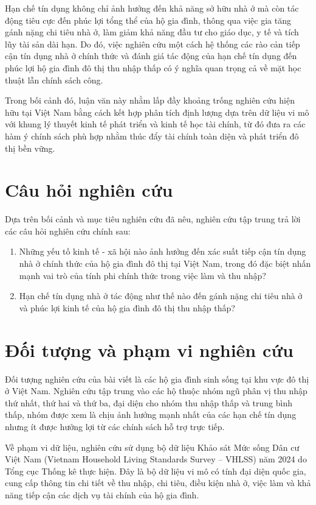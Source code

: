 \documentclass[12pt,a4paper]{report}
\begin{document}
	Hạn chế tín dụng không chỉ ảnh hưởng đến khả năng sở hữu nhà ở mà còn tác động tiêu cực đến phúc lợi tổng thể của hộ gia đình, thông qua việc gia tăng gánh nặng chi tiêu nhà ở, làm giảm khả năng đầu tư cho giáo dục, y tế và tích lũy tài sản dài hạn. Do đó, việc nghiên cứu một cách hệ thống các rào cản tiếp cận tín dụng nhà ở chính thức và đánh giá tác động của hạn chế tín dụng đến phúc lợi hộ gia đình đô thị thu nhập thấp có ý nghĩa quan trọng cả về mặt học thuật lẫn chính sách công.
	
	Trong bối cảnh đó, luận văn này nhằm lấp đầy khoảng trống nghiên cứu hiện hữu tại Việt Nam bằng cách kết hợp phân tích định lượng dựa trên dữ liệu vi mô với khung lý thuyết kinh tế phát triển và kinh tế học tài chính, từ đó đưa ra các hàm ý chính sách phù hợp nhằm thúc đẩy tài chính toàn diện và phát triển đô thị bền vững.
	
	\section{Câu hỏi nghiên cứu}
	
	Dựa trên bối cảnh và mục tiêu nghiên cứu đã nêu, nghiên cứu tập trung trả lời các câu hỏi nghiên cứu chính sau:
	
	\begin{enumerate}
		\item Những yếu tố kinh tế - xã hội nào ảnh hưởng đến xác suất tiếp cận tín dụng nhà ở chính thức của hộ gia đình đô thị tại Việt Nam, trong đó đặc biệt nhấn mạnh vai trò của tính phi chính thức trong việc làm và thu nhập?
		\item Hạn chế tín dụng nhà ở tác động như thế nào đến gánh nặng chi tiêu nhà ở và phúc lợi kinh tế của hộ gia đình đô thị thu nhập thấp?
	\end{enumerate}
	
	\section{Đối tượng và phạm vi nghiên cứu}
	
	Đối tượng nghiên cứu của bài viết là các hộ gia đình sinh sống tại khu vực đô thị ở Việt Nam. Nghiên cứu tập trung vào các hộ thuộc nhóm ngũ phân vị thu nhập thứ nhất, thứ hai và thứ ba, đại diện cho nhóm thu nhập thấp và trung bình thấp, nhóm được xem là chịu ảnh hưởng mạnh nhất của các hạn chế tín dụng nhưng ít được hưởng lợi từ các chính sách hỗ trợ trực tiếp.
	
	Về phạm vi dữ liệu, nghiên cứu sử dụng bộ dữ liệu Khảo sát Mức sống Dân cư Việt Nam (Vietnam Household Living Standards Survey -- VHLSS) năm 2024 \parencite{VHLSS2024} do Tổng cục Thống kê thực hiện. Đây là bộ dữ liệu vi mô có tính đại diện quốc gia, cung cấp thông tin chi tiết về thu nhập, chi tiêu, điều kiện nhà ở, việc làm và khả năng tiếp cận các dịch vụ tài chính của hộ gia đình.
	
\end{document}
